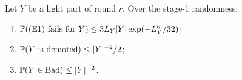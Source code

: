 \begin{lemma}\label{s5:lemE1}
Let $Y$ be a light part of round $r$. Over the stage-1 randomness:
\begin{enumerate}
\item[(a)] $\mathbb{P}(\text{(E1) fails for }Y)\le 3L_Y|Y|\exp(-L_Y^5/32)$;
\item[(b)] $\mathbb{P}(Y\text{ is demoted})\le|Y|^{-2}/2$;
\item[(c)] $\mathbb{P}(Y\in\mathrm{Bad})\le|Y|^{-2}$.
\end{enumerate}
\deps{\ref{s3:lemCOL}, \ref{s3:lemHB}, \ref{s5:lemZones}, \ref{s5:defStages}, \ref{s1:citChernoffGen}, \ref{s3:defCOL}, \ref{s3:lemL15p}, \ref{s3:lemCOLJV}, \ref{s2:propStructure}, \ref{s2:lemTower}, \ref{s1:condG1}}
\end{lemma}

